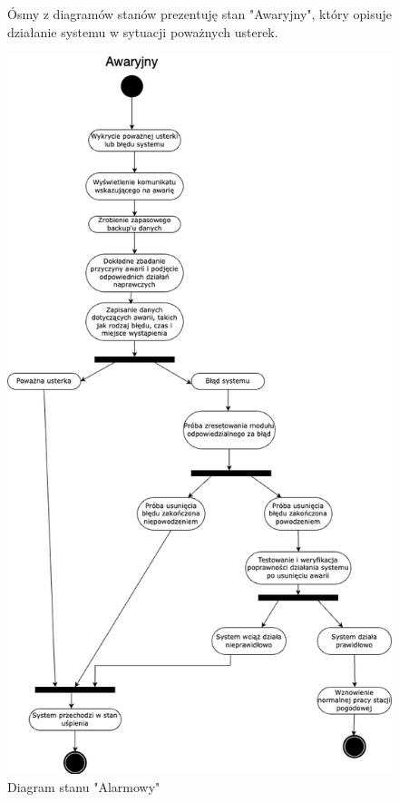 \documentclass{article}
\begin{document}
\begin{figure}
    \centering
    \begin{minipage}{0.6\textwidth}
        \centering
        \large Ósmy z diagramów stanów prezentuję stan "Awaryjny", który opisuje działanie systemu w sytuacji poważnych usterek.
    \end{minipage}
    \includegraphics[scale=0.5]{awaryjny.png}
    \caption{Diagram stanu "Alarmowy"}
    \label{etykieta12}
\end{figure}
\end{document}
